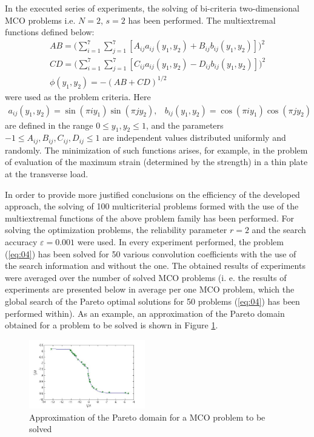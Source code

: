 \documentclass[procedia]{easychair}
\begin{document}
In the executed series of experiments, the solving of bi-criteria two-dimensional MCO problems i.e. $N=2$, $s=2$ has been performed. The multiextremal functions defined below:
\begin{equation*}
\begin{matrix}
AB = \Big(\sum_{i=1}^7 \sum_{j=1}^7 [A_{ij} a_{ij}(y_1, y_2) + B_{ij} b_{ij}(y_1, y_2)]\Big)^2 \\
CD = \Big(\sum_{i=1}^7 \sum_{j=1}^7 [C_{ij} a_{ij}(y_1, y_2) - D_{ij} b_{ij}(y_1, y_2)]\Big)^2 \\ 
\phi(y_1, y_2) = - (AB + CD)^{1/2}
\end{matrix}
\end{equation*}
were used as the problem criteria. Here 
\begin{equation*}
\begin{matrix}
a_{ij}(y_1, y_2) = \sin(\pi i y_1) \sin(\pi j y_2), &
b_{ij}(y_1, y_2) = \cos(\pi i y_1) \cos(\pi j y_2)
\end{matrix}
\end{equation*}
are defined in the range $0 \leq y_1, y_2 \leq 1$, and the parameters  $-1\leq A_{ij},B_{ij},C_{ij},D_{ij} \leq 1$ are independent values distributed uniformly and randomly. The minimization of such functions arises, for example, in the problem of evaluation of the maximum strain (determined by the strength) in a thin plate at the transverse load. \par

In order to provide more justified conclusions on the efficiency of the developed approach, the solving of 100 multicriterial problems formed with the use of the multiextremal functions of the above problem family has been performed. For solving the optimization problems, the reliability parameter $r=2$ and the search accuracy $\varepsilon=0.001$ were used. In every experiment performed, the problem (\ref{eq:04}) has been solved for 50 various convolution coefficients with the use of the search information and without the one. The obtained results of experiments were averaged over the number of solved MCO problems (i. e. the results of experiments are presented below in average per one MCO problem, which the global search of the Pareto optimal solutions for 50 problems (\ref{eq:04}) has been performed within). As an example, an approximation of the Pareto domain obtained for a problem to be solved is shown in Figure \ref{fig:F1F2_gr}.

\begin{figure}
	\centering
	\includegraphics[width=0.45\textwidth]{F1F2_gr}
	\caption{Approximation of the Pareto domain for a MCO problem to be solved}
	\label{fig:F1F2_gr}
\end{figure}
\end{document}
